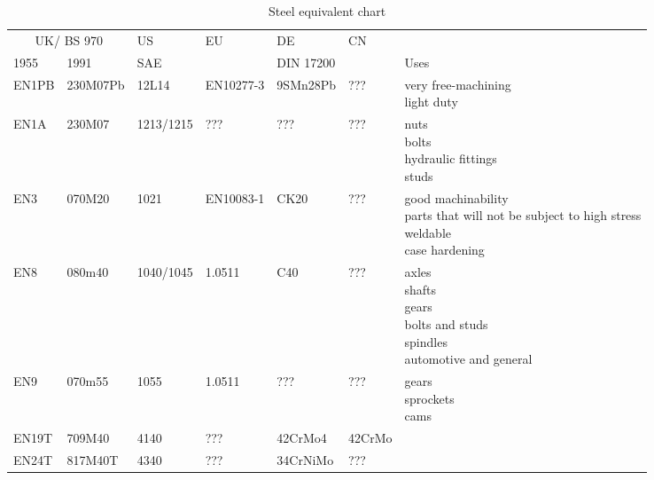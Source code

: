 \begin{table}[h!]
    \footnotesize
\begin{longtable}{l|l|l|l|l|l|l}
    \multicolumn{2}{c}{UK/ BS 970}&US&EU&DE&CN&\\
    1955
    &1991
    &SAE
    &
    &DIN 17200
    &
    &Uses
    \\
\hline
    EN1PB & 230M07Pb & 12L14      & EN10277-3 & 9SMn28Pb & ??? & \makecell{very free-machining\\light duty}\\
    \hline
    EN1A  & 230M07   & 1213/1215  & ???       & ???      & ??? & \makecell{nuts\\bolts\\hydraulic fittings\\studs}\\
    \hline
    EN3   & 070M20   & 1021       & EN10083-1 & CK20     & ??? & \makecell{good machinability\\parts that will not be subject to high stress\\ weldable\\case hardening}\\
    \hline
    EN8   & 080m40   & 1040/1045  & 1.0511    & C40      & ??? &\makecell{axles\\shafts\\ gears\\bolts and studs\\spindles\\automotive and general}\\
    \hline
    EN9   & 070m55   & 1055       & 1.0511    & ???      & ??? &\makecell{gears\\sprockets\\cams}\\
    \hline
    EN19T & 709M40   & 4140       & ???       & 42CrMo4  & 42CrMo & \\
    \hline
    EN24T & 817M40T  & 4340       & ???       & 34CrNiMo & ??? & \\
\end{longtable}
    \caption{Steel equivalent chart}
\end{table}
